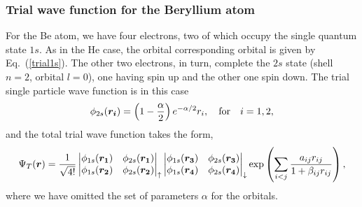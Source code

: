 \subsubsection{Trial wave function for the Beryllium atom}

For the Be atom, we have four electrons, two of which occupy the single quantum state $1s$. As in the He case, the orbital corresponding orbital is given by Eq.~(\ref{trial1s}). The other two electrons, in turn, complete the $2s$ state (shell $n=2$, orbital $l=0$), one having spin up and the other one spin down. The trial single particle wave function is in this case 
\begin{equation}\label{trial2s}
 \phi_{2s}(\boldsymbol{r_i}) = \left(1 - \frac{\alpha}{2}\right) e^{-\alpha/2}{r_i}, \quad \text{for} \quad i=1,2,
\end{equation}
and the total trial wave function takes the form,
\begin{equation}
\Psi_T(\boldsymbol{r}) = \frac{1}{\sqrt{4!}}
  \begin{vmatrix}
  \phi_{1s}(\boldsymbol{r_1}) & \phi_{2s}(\boldsymbol{r_1})\\
  \phi_{1s}(\boldsymbol{r_2}) & \phi_{2s}(\boldsymbol{r_2}) \\
\end{vmatrix}_{\uparrow} 
  \begin{vmatrix}
  \phi_{1s}(\boldsymbol{r_3}) & \phi_{2s}(\boldsymbol{r_3})\\
  \phi_{1s}(\boldsymbol{r_4}) & \phi_{2s}(\boldsymbol{r_4}) \\
\end{vmatrix}_{\downarrow} \exp\left(\sum_{i<j}\frac{a_{ij} r_{ij}}{1 + \beta_{ij} r_{ij}}\right),
\end{equation}
where we have omitted the set of parameters $\alpha$  for the orbitals.

